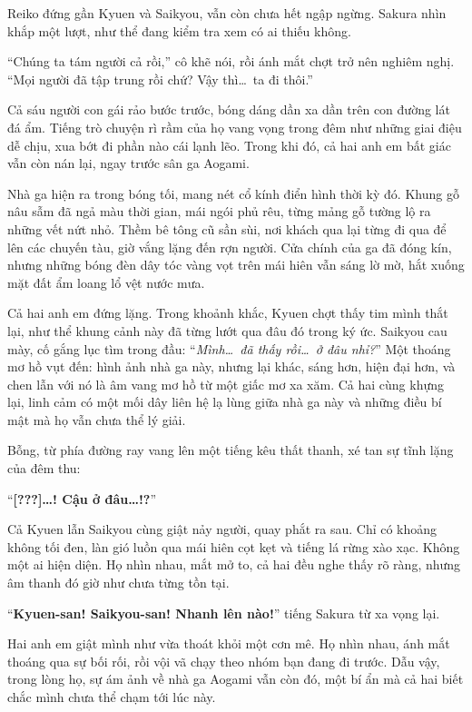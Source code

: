 \documentclass[../main.tex]{subfiles}
\begin{document}
Reiko đứng gần Kyuen và Saikyou, vẫn còn chưa hết ngập ngừng. Sakura nhìn khắp một lượt, như thể đang kiểm tra xem có ai thiếu không.

``Chúng ta tám người cả rồi,'' cô khẽ nói, rồi ánh mắt chợt trở nên nghiêm nghị. ``Mọi người đã tập trung rồi chứ? Vậy thì\dots\ ta đi thôi.''


Cả sáu người con gái rảo bước trước, bóng dáng dần xa dần trên con đường lát đá ẩm. Tiếng trò chuyện rì rầm của họ vang vọng trong đêm như những giai điệu dễ chịu, xua bớt đi phần nào cái lạnh lẽo. Trong khi đó, cả hai anh em bất giác vẫn còn nán lại, ngay trước sân ga Aogami.

Nhà ga hiện ra trong bóng tối, mang nét cổ kính điển hình thời kỳ đó. Khung gỗ nâu sẫm đã ngả màu thời gian, mái ngói phủ rêu, từng mảng gỗ tường lộ ra những vết nứt nhỏ. Thềm bê tông cũ sần sùi, nơi khách qua lại từng đi qua để lên các chuyến tàu, giờ vắng lặng đến rợn người. Cửa chính của ga đã đóng kín, nhưng những bóng đèn dây tóc vàng vọt trên mái hiên vẫn sáng lờ mờ, hắt xuống mặt đất ẩm loang lổ vệt nước mưa.

Cả hai anh em đứng lặng. Trong khoảnh khắc, Kyuen chợt thấy tim mình thắt lại, như thể khung cảnh này đã từng lướt qua đâu đó trong ký ức. Saikyou cau mày, cố gắng lục tìm trong đầu: ``\textit{Mình\dots\ đã thấy rồi\dots\ ở đâu nhỉ?}'' Một thoáng mơ hồ vụt đến: hình ảnh nhà ga này, nhưng lại khác, sáng hơn, hiện đại hơn, và chen lẫn với nó là âm vang mơ hồ từ một giấc mơ xa xăm. Cả hai cùng khựng lại, linh cảm có một mối dây liên hệ lạ lùng giữa nhà ga này và những điều bí mật mà họ vẫn chưa thể lý giải.

Bỗng, từ phía đường ray vang lên một tiếng kêu thất thanh, xé tan sự tĩnh lặng của đêm thu:

``\textbf{[???]\dots! Cậu ở đâu\dots!?}''

Cả Kyuen lẫn Saikyou cùng giật nảy người, quay phắt ra sau. Chỉ có khoảng không tối đen, làn gió luồn qua mái hiên cọt kẹt và tiếng lá rừng xào xạc. Không một ai hiện diện. Họ nhìn nhau, mắt mở to, cả hai đều nghe thấy rõ ràng, nhưng âm thanh đó giờ như chưa từng tồn tại.

``\textbf{Kyuen-san! Saikyou-san! Nhanh lên nào!}'' tiếng Sakura từ xa vọng lại.

Hai anh em giật mình như vừa thoát khỏi một cơn mê. Họ nhìn nhau, ánh mắt thoáng qua sự bối rối, rồi vội vã chạy theo nhóm bạn đang đi trước. Dẫu vậy, trong lòng họ, sự ám ảnh về nhà ga Aogami vẫn còn đó, một bí ẩn mà cả hai biết chắc mình chưa thể chạm tới lúc này.
\end{document}
